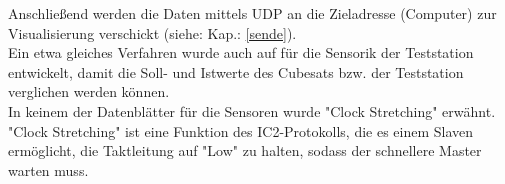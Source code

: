 Anschließend werden die Daten mittels UDP an die Zieladresse (Computer) zur Visualisierung verschickt (siehe: Kap.: \ref{sende}). \\
\vspace{3mm}
Ein etwa gleiches Verfahren wurde auch auf für die Sensorik der Teststation entwickelt, damit die Soll- und Istwerte des Cubesats bzw. der Teststation verglichen werden können. \\
\vspace{3mm}
In keinem der Datenblätter für die Sensoren wurde "Clock Stretching" erwähnt. "Clock Stretching\autocite{I2CMode}" ist eine Funktion des IC2-Protokolls, die es einem Slaven ermöglicht, die Taktleitung auf "Low" zu halten, sodass der schnellere Master warten muss.
